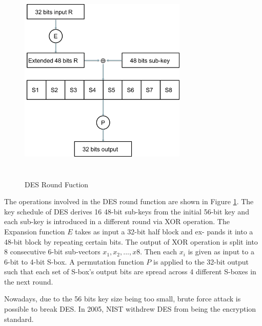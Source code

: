 \begin{figure}[h!]
	\centering
	\includegraphics[width=80mm,height=100mm]{./pics/DES_round.png}
	\caption[DES Round Fuction]{DES Round Fuction}
	\label{Fig:DESRound}
\end{figure}

The operations involved in the DES round function are shown in Figure \ref{Fig:DESRound}. The key schedule of DES derives 16 48-bit sub-keys from the initial 56-bit key and each sub-key is introduced in a different round via XOR operation. The Expansion function $E$ takes as input a 32-bit half block and ex-
pands it into a 48-bit block by repeating certain bits. The output of XOR operation is split into 8 consecutive 6-bit sub-vectors $x_1, x_2, ... , x8$. Then each $x_i$ is given as input to a 6-bit to 4-bit S-box. A permutation function $P$ is applied to the 32-bit output such that each set of S-box's output bits are spread across 4 different S-boxes in the next round.

Nowadays, due to the 56 bits key size being too small, brute
force attack is possible to break DES. In 2005, NIST withdrew DES
from being the encryption standard. 